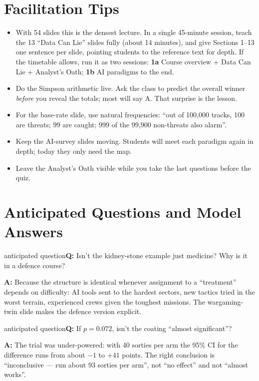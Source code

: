 \documentclass[11pt]{article}
\begin{document}
\section{Facilitation Tips}\begin{itemize}\item With 54 slides this is the densest lecture. In a single 45-minute session, teach the 13 ``Data Can Lie'' slides fully (about 14 minutes), and give Sections 1--13 one sentence per slide, pointing students to the reference text for depth. If the timetable allows, run it as two sessions: \textbf{1a} Course overview + Data Can Lie + Analyst's Oath; \textbf{1b} AI paradigms to the end.\item Do the Simpson arithmetic live. Ask the class to predict the overall winner \emph{before} you reveal the totals; most will say A. That surprise is the lesson.\item For the base-rate slide, use natural frequencies: ``out of 100,000 tracks, 100 are threats; 99 are caught; 999 of the 99,900 non-threats also alarm''.\item Keep the AI-survey slides moving. Students will meet each paradigm again in depth; today they only need the map.\item Leave the Analyst's Oath visible while you take the last questions before the quiz.\end{itemize}

\section{Anticipated Questions and Model Answers}

\begin{question}{anticipated question}\textbf{Q:} Isn't the kidney-stone example just medicine? Why is it in a defence course?\par\smallskip\textbf{A:} Because the structure is identical whenever assignment to a ``treatment'' depends on difficulty: AI tools sent to the hardest sectors, new tactics tried in the worst terrain, experienced crews given the toughest missions. The wargaming-twin slide makes the defence version explicit.\end{question}

\begin{question}{anticipated question}\textbf{Q:} If $p=0.072$, isn't the coating ``almost significant''?\par\smallskip\textbf{A:} The trial was under-powered: with 40 sorties per arm the 95\% CI for the difference runs from about $-1$ to $+41$ points. The right conclusion is ``inconclusive --- run about 93 sorties per arm'', not ``no effect'' and not ``almost works''.\end{question}
\end{document}
